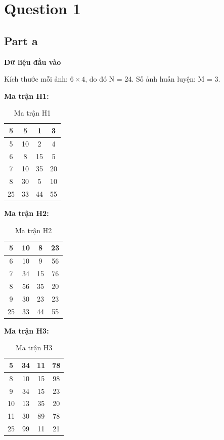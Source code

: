 \section{Question 1}
\subsection{Part a}

\textbf{Dữ liệu đầu vào}

Kích thước mỗi ảnh: $6 \times 4$, do đó N = 24. Số ảnh huấn luyện: M = 3.

\textbf{Ma trận H1:}
\begin{table}[H]
\centering
\begin{tabular}{|c|c|c|c|}
\hline
5 & 5 & 1 & 3 \\
\hline
5 & 10 & 2 & 4 \\
\hline
6 & 8 & 15 & 5 \\
\hline
7 & 10 & 35 & 20 \\
\hline
8 & 30 & 5 & 10 \\
\hline
25 & 33 & 44 & 55 \\
\hline
\end{tabular}
\caption{Ma trận H1}
\end{table}

\textbf{Ma trận H2:}
\begin{table}[H]
\centering
\begin{tabular}{|c|c|c|c|}
\hline
5 & 10 & 8 & 23 \\
\hline
6 & 10 & 9 & 56 \\
\hline
7 & 34 & 15 & 76 \\
\hline
8 & 56 & 35 & 20 \\
\hline
9 & 30 & 23 & 23 \\
\hline
25 & 33 & 44 & 55 \\
\hline
\end{tabular}
\caption{Ma trận H2}
\end{table}

\textbf{Ma trận H3:}
\begin{table}[H]
\centering
\begin{tabular}{|c|c|c|c|}
\hline
5 & 34 & 11 & 78 \\
\hline
8 & 10 & 15 & 98 \\
\hline
9 & 34 & 15 & 23 \\
\hline
10 & 13 & 35 & 20 \\
\hline
11 & 30 & 89 & 78 \\
\hline
25 & 99 & 11 & 21 \\
\hline
\end{tabular}
\caption{Ma trận H3}
\end{table}


